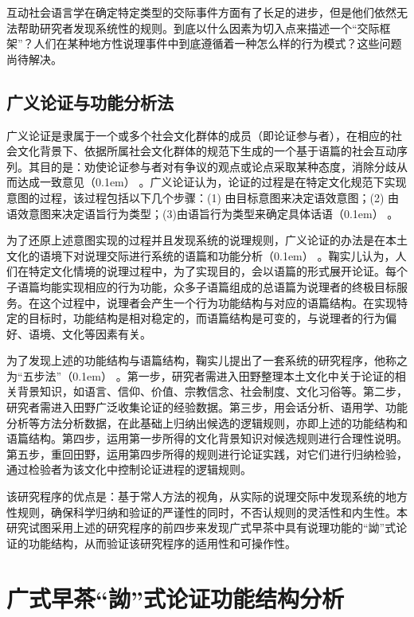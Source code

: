 \documentclass[b5paper,10.5pt,onecolumn,twoside,leqno,UTF8]{article}
\newcommand{\pcr}[1]{\raise0.1em\hbox{\parencite{#1}}}
\newcommand{\cpcr}[1]{（\pcr{#1}）}
\begin{document}
互动社会语言学在确定特定类型的交际事件方面有了长足的进步，但是他们依然无法帮助研究者发现系统性的规则。到底以什么因素为切入点来描述一个“交际框架”？人们在某种地方性说理事件中到底遵循着一种怎么样的行为模式？这些问题尚待解决。

\subsection{广义论证与功能分析法}

广义论证是隶属于一个或多个社会文化群体的成员（即论证参与者），在相应的社会文化背景下、依据所属社会文化群体的规范下生成的一个基于语篇的社会互动序列。其目的是：劝使论证参与者对有争议的观点或论点采取某种态度，消除分歧从而达成一致意见\cpcr{ju2} 。广义论证认为，论证的过程是在特定文化规范下实现意图的过程，该过程包括以下几个步骤：(1) 由目标意图来决定语效意图；(2) 由语效意图来决定语旨行为类型；(3)由语旨行为类型来确定具体话语\cpcr{ju1} 。

为了还原上述意图实现的过程并且发现系统的说理规则，广义论证的办法是在本土文化的语境下对说理交际进行系统的语篇和功能分析\cpcr{ju2} 。鞠实儿认为，人们在特定文化情境的说理过程中，为了实现目的，会以语篇的形式展开论证。每个子语篇均能实现相应的行为功能，众多子语篇组成的总语篇为说理者的终极目标服务。在这个过程中，说理者会产生一个行为功能结构与对应的语篇结构。在实现特定的目标时，功能结构是相对稳定的，而语篇结构是可变的，与说理者的行为偏好、语境、文化等因素有关。

为了发现上述的功能结构与语篇结构，鞠实儿提出了一套系统的研究程序，他称之为“五步法”\cpcr{ju2} 。第一步，研究者需进入田野整理本土文化中关于论证的相关背景知识，如语言、信仰、价值、宗教信念、社会制度、文化习俗等。第二步，研究者需进入田野广泛收集论证的经验数据。第三步，用会话分析、语用学、功能分析等方法分析数据，在此基础上归纳出候选的逻辑规则，亦即上述的功能结构和语篇结构。第四步，运用第一步所得的文化背景知识对候选规则进行合理性说明。第五步，重回田野，运用第四步所得的规则进行论证实践，对它们进行归纳检验，通过检验者为该文化中控制论证进程的逻辑规则。

该研究程序的优点是：基于常人方法的视角，从实际的说理交际中发现系统的地方性规则，确保科学归纳和验证的严谨性的同时，不否认规则的灵活性和内生性。本研究试图采用上述的研究程序的前四步来发现广式早茶中具有说理功能的“詏”式论证的功能结构，从而验证该研究程序的适用性和可操作性。

\section{广式早茶“詏”式论证功能结构分析}
\end{document}
